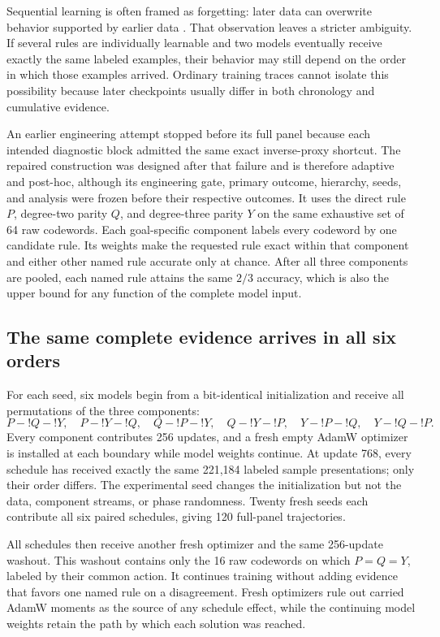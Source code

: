 \documentclass[11pt,a4paper]{article}
\begin{document}
Sequential learning is often framed as forgetting: later data can overwrite behavior supported by earlier data \citep{kirkpatrick2017forgetting}. That observation leaves a stricter ambiguity. If several rules are individually learnable and two models eventually receive exactly the same labeled examples, their behavior may still depend on the order in which those examples arrived. Ordinary training traces cannot isolate this possibility because later checkpoints usually differ in both chronology and cumulative evidence.

An earlier engineering attempt stopped before its full panel because each intended diagnostic block admitted the same exact inverse-proxy shortcut. The repaired construction was designed after that failure and is therefore adaptive and post-hoc, although its engineering gate, primary outcome, hierarchy, seeds, and analysis were frozen before their respective outcomes. It uses the direct rule $P$, degree-two parity $Q$, and degree-three parity $Y$ on the same exhaustive set of 64 raw codewords. Each goal-specific component labels every codeword by one candidate rule. Its weights make the requested rule exact within that component and either other named rule accurate only at chance. After all three components are pooled, each named rule attains the same $2/3$ accuracy, which is also the upper bound for any function of the complete model input.

\subsection*{The same complete evidence arrives in all six orders}

For each seed, six models begin from a bit-identical initialization and receive all permutations of the three components:
\[
P\!-!Q\!-!Y,\quad P\!-!Y\!-!Q,\quad
Q\!-!P\!-!Y,\quad Q\!-!Y\!-!P,\quad
Y\!-!P\!-!Q,\quad Y\!-!Q\!-!P.
\]
Every component contributes 256 updates, and a fresh empty AdamW optimizer is installed at each boundary while model weights continue. At update 768, every schedule has received exactly the same 221,184 labeled sample presentations; only their order differs. The experimental seed changes the initialization but not the data, component streams, or phase randomness. Twenty fresh seeds each contribute all six paired schedules, giving 120 full-panel trajectories.

All schedules then receive another fresh optimizer and the same 256-update washout. This washout contains only the 16 raw codewords on which $P=Q=Y$, labeled by their common action. It continues training without adding evidence that favors one named rule on a disagreement. Fresh optimizers rule out carried AdamW moments as the source of any schedule effect, while the continuing model weights retain the path by which each solution was reached.
\end{document}
